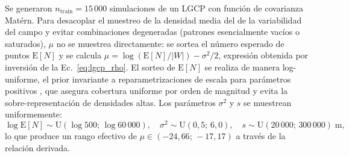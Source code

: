 \documentclass[a4paper,fleqn]{cas-sc}
\numberwithin{equation}{section}
\begin{document}
Se generaron $n_{\mathrm{train}}=15\,000$ simulaciones de un LGCP con
funci\'on de covarianza Mat\'ern. Para desacoplar el muestreo de la
densidad media del de la variabilidad del campo y evitar combinaciones
degeneradas (patrones esencialmente vac\'ios o saturados), $\mu$ no se
muestrea directamente: se sortea el n\'umero esperado de puntos
$\mathrm{E}[N]$ y se calcula
$\mu = \log(\mathrm{E}[N]/|W|) - \sigma^2/2$, expresi\'on obtenida por
inversi\'on de la Ec.~\ref{eq:lgcp_rho}. El sorteo de $\mathrm{E}[N]$
se realiza de manera log-uniforme, el prior invariante a
reparametrizaciones de escala para par\'ametros positivos
\citep{Jeffreys1946}, que asegura cobertura uniforme por orden de
magnitud y evita la sobre-representaci\'on de densidades altas. Los
par\'ametros $\sigma^2$ y $s$ se muestrean uniformemente:
\begin{equation}
    \log\mathrm{E}[N] \sim \mathrm{U}(\log 500;\,\log 60\,000), \quad
    \sigma^2 \sim \mathrm{U}(0{,}5;\, 6{,}0), \quad
    s \sim \mathrm{U}(20\,000;\, 300\,000)\;\text{m},
    \label{eq:param_ranges}
\end{equation}
lo que produce un rango efectivo de $\mu \in (-24{,}66;\, -17{,}17)$ a
trav\'es de la relaci\'on derivada.
\end{document}
